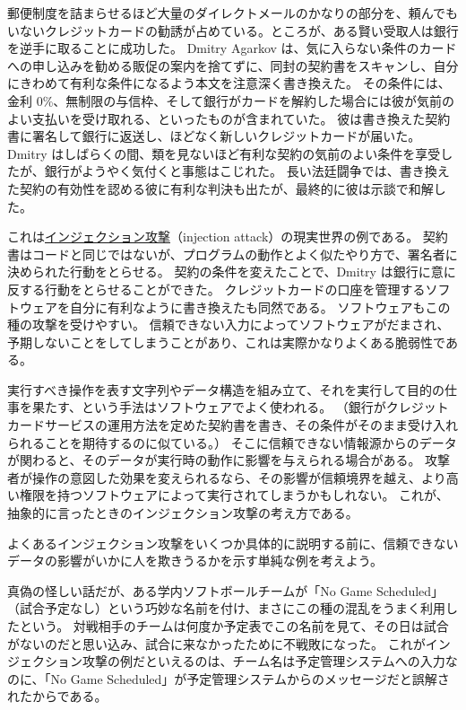 \documentclass[uplatex]{jsarticle}
\def\label#1{}%
\begin{document}
\begin{exa}[クレジットカード契約書の書き換え]\label{exa:ch10-agarkov-contract}
郵便制度を詰まらせるほど大量のダイレクトメールのかなりの部分を、頼んでもいないクレジットカードの勧誘が占めている。ところが、ある賢い受取人は銀行を逆手に取ることに成功した。
Dmitry Agarkov は、気に入らない条件のカードへの申し込みを勧める販促の案内を捨てずに、同封の契約書をスキャンし、自分にきわめて有利な条件になるよう本文を注意深く書き換えた。
その条件には、金利 0\%、無制限の与信枠、そして銀行がカードを解約した場合には彼が気前のよい支払いを受け取れる、といったものが含まれていた。
彼は書き換えた契約書に署名して銀行に返送し、ほどなく新しいクレジットカードが届いた。
Dmitry はしばらくの間、類を見ないほど有利な契約の気前のよい条件を享受したが、銀行がようやく気付くと事態はこじれた。
長い法廷闘争では、書き換えた契約の有効性を認める彼に有利な判決も出たが、最終的に彼は示談で和解した。
\end{exa}

これは\underline{インジェクション攻撃}（injection attack）の現実世界の例である。
契約書はコードと同じではないが、プログラムの動作とよく似たやり方で、署名者に決められた行動をとらせる。
契約の条件を変えたことで、Dmitry は銀行に意に反する行動をとらせることができた。
クレジットカードの口座を管理するソフトウェアを自分に有利なように書き換えたも同然である。
ソフトウェアもこの種の攻撃を受けやすい。
信頼できない入力によってソフトウェアがだまされ、予期しないことをしてしまうことがあり、これは実際かなりよくある脆弱性である。

\begin{dfn}[インジェクション攻撃の考え方]\label{dfn:ch10-injection-attack}
実行すべき操作を表す文字列やデータ構造を組み立て、それを実行して目的の仕事を果たす、という手法はソフトウェアでよく使われる。
（銀行がクレジットカードサービスの運用方法を定めた契約書を書き、その条件がそのまま受け入れられることを期待するのに似ている。）
そこに信頼できない情報源からのデータが関わると、そのデータが実行時の動作に影響を与えられる場合がある。
攻撃者が操作の意図した効果を変えられるなら、その影響が信頼境界を越え、より高い権限を持つソフトウェアによって実行されてしまうかもしれない。
これが、抽象的に言ったときのインジェクション攻撃の考え方である。
\end{dfn}

よくあるインジェクション攻撃をいくつか具体的に説明する前に、信頼できないデータの影響がいかに人を欺きうるかを示す単純な例を考えよう。

\begin{exa}\label{exa:ch10-no-game-scheduled}
真偽の怪しい話だが、ある学内ソフトボールチームが「No Game Scheduled」（試合予定なし）という巧妙な名前を付け、まさにこの種の混乱をうまく利用したという。
対戦相手のチームは何度か予定表でこの名前を見て、その日は試合がないのだと思い込み、試合に来なかったために不戦敗になった。
これがインジェクション攻撃の例だといえるのは、チーム名は予定管理システムへの入力なのに、「No Game Scheduled」が予定管理システムからのメッセージだと誤解されたからである。
\end{exa}
\end{document}
